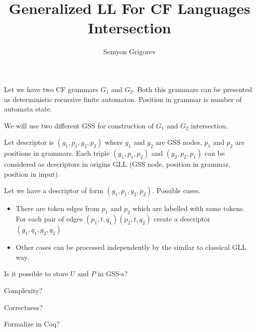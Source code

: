\documentclass[12pt]{article}  %
\title{Generalized LL For CF Languages Intersection}
\author{Semyon Grigorev}
\theoremstyle{definition}
\theoremstyle{remark}
\begin{document}
\maketitle

Let we have two CF grammars $G_1$ and $G_2$. 
Both this grammars can be presented as deterministic recursive finite automaton.
Position in grammar is number of automata state.

We will use two different GSS for construction of $G_1$ and $G_2$ intersection.

Let descriptor is $(g_1,p_1,g_2,p_2)$ where $g_1$ and $g_2$ are GSS nodes, $p_1$ and $p_2$ are 
positions in grammars. Each triple $(g_1, p_1, p_2)$ and $(g_2, p_2, p_1)$ can be considered as 
descriptors in origins GLL (GSS node, position in grammar, position in input). 

Let we have a descriptor of form $(g_1,p_1,g_2,p_2)$. Possible cases.
\begin{itemize}
\item There are token edges from $p_1$ and $p_2$ which are labelled with same tokens. For each pair 
of edges $(p_1,t,q_1)(p_2,t,q_2)$ create a descriptor $(g_1,q_1,g_2,q_2)$
\item Other cases can be processed independently by the similar to classical GLL way.
\end{itemize}

Is it possible to store $U$ and $P$ in GSS-s?

Complexity?

Correctness?

Formalize in Coq?
\end{document}
